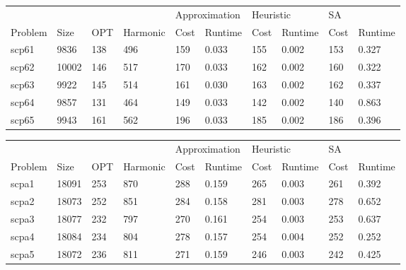 \begin{table}[]
\centering
\begin{tabular}{@{}llllllllll@{}}
\toprule
        &       &     &          & \multicolumn{2}{l}{Approximation} & \multicolumn{2}{l}{Heuristic} & \multicolumn{2}{l}{SA} \\
Problem & Size  & OPT & Harmonic & Cost           & Runtime          & Cost         & Runtime        & Cost     & Runtime     \\ \midrule
scp61   & 9836  & 138 & 496      & 159            & 0.033            & 155          & 0.002          & 153      & 0.327       \\
scp62   & 10002 & 146 & 517      & 170            & 0.033            & 162          & 0.002          & 160      & 0.322       \\
scp63   & 9922  & 145 & 514      & 161            & 0.030            & 163          & 0.002          & 162      & 0.337       \\
scp64   & 9857  & 131 & 464      & 149            & 0.033            & 142          & 0.002          & 140      & 0.863       \\
scp65   & 9943  & 161 & 562      & 196            & 0.033            & 185          & 0.002          & 186      & 0.396       \\ \bottomrule
\end{tabular}
\end{table}

\begin{table}[]
\centering
\begin{tabular}{@{}llllllllll@{}}
\toprule
        &       &     &          & \multicolumn{2}{l}{Approximation} & \multicolumn{2}{l}{Heuristic} & \multicolumn{2}{l}{SA} \\
Problem & Size  & OPT & Harmonic & Cost           & Runtime          & Cost         & Runtime        & Cost     & Runtime     \\ \midrule
scpa1   & 18091 & 253 & 870      & 288            & 0.159            & 265          & 0.003          & 261      & 0.392       \\
scpa2   & 18073 & 252 & 851      & 284            & 0.158            & 281          & 0.003          & 278      & 0.652       \\
scpa3   & 18077 & 232 & 797      & 270            & 0.161            & 254          & 0.003          & 253      & 0.637       \\
scpa4   & 18084 & 234 & 804      & 278            & 0.157            & 254          & 0.004          & 252      & 0.252       \\
scpa5   & 18072 & 236 & 811      & 271            & 0.159            & 246          & 0.003          & 242      & 0.425       \\ \bottomrule
\end{tabular}
\end{table}

